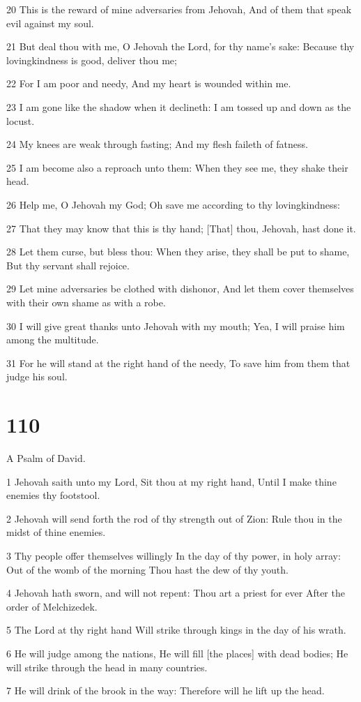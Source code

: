 \par 20 This is the reward of mine adversaries from Jehovah, And of them that speak evil against my soul.
\par 21 But deal thou with me, O Jehovah the Lord, for thy name's sake: Because thy lovingkindness is good, deliver thou me;
\par 22 For I am poor and needy, And my heart is wounded within me.
\par 23 I am gone like the shadow when it declineth: I am tossed up and down as the locust.
\par 24 My knees are weak through fasting; And my flesh faileth of fatness.
\par 25 I am become also a reproach unto them: When they see me, they shake their head.
\par 26 Help me, O Jehovah my God; Oh save me according to thy lovingkindness:
\par 27 That they may know that this is thy hand; [That] thou, Jehovah, hast done it.
\par 28 Let them curse, but bless thou: When they arise, they shall be put to shame, But thy servant shall rejoice.
\par 29 Let mine adversaries be clothed with dishonor, And let them cover themselves with their own shame as with a robe.
\par 30 I will give great thanks unto Jehovah with my mouth; Yea, I will praise him among the multitude.
\par 31 For he will stand at the right hand of the needy, To save him from them that judge his soul.

\chapter{110}

\par A Psalm of David.

\par 1 Jehovah saith unto my Lord, Sit thou at my right hand, Until I make thine enemies thy footstool.
\par 2 Jehovah will send forth the rod of thy strength out of Zion: Rule thou in the midst of thine enemies.
\par 3 Thy people offer themselves willingly In the day of thy power, in holy array: Out of the womb of the morning Thou hast the dew of thy youth.
\par 4 Jehovah hath sworn, and will not repent: Thou art a priest for ever After the order of Melchizedek.
\par 5 The Lord at thy right hand Will strike through kings in the day of his wrath.
\par 6 He will judge among the nations, He will fill [the places] with dead bodies; He will strike through the head in many countries.
\par 7 He will drink of the brook in the way: Therefore will he lift up the head.

